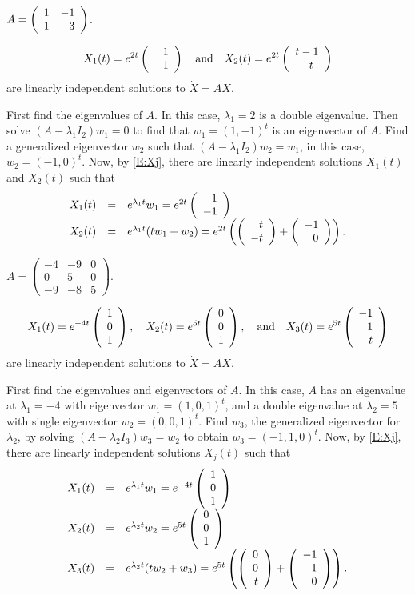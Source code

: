 \documentclass{ximera}
\begin{document}
\begin{exercise} \label{c12.1.2c}
$A=\left(\begin{array}{rr} 1 & -1\\ 1 &3\end{array}\right)$.

\begin{solution}
\ans
\[
X_1(t) = e^{2t}\left(\begin{array}{r} 1 \\ -1\end{array}\right) \quad\mbox{and}\quad
X_2(t) = e^{2t}\left(\begin{array}{c} t - 1 \\ -t\end{array}\right)
\]
are linearly independent solutions to $\dot{X} = AX$.

\soln First find the eigenvalues of $A$.  In this case, $\lambda_1 = 2$
is a double eigenvalue.  Then solve $(A - \lambda_1 I_2)w_1 = 0$ to
find that $w_1 = (1,-1)^t$ is an eigenvector of $A$.  Find a
generalized eigenvector $w_2$ such that $(A - \lambda_1 I_2)w_2 =
w_1$, in this case, $w_2 = (-1,0)^t$.  Now, by \eqref{E:Xj},
there are linearly independent solutions $X_1(t)$ and $X_2(t)$ such that
\[
\begin{array}{rcl}
X_1(t) & = & e^{\lambda_1 t}w_1 = e^{2t}\left(\begin{array}{r} 1 \\ -1\end{array}\right) \\
X_2(t) & = & e^{\lambda_1 t}(tw_1 + w_2) = e^{2t}\left(\left(\begin{array}{r} t \\ -t\end{array}\right) +
\left(\begin{array}{r} -1 \\ 0\end{array}\right)\right).
\end{array}
\]

\end{solution}
\end{exercise}
\begin{exercise} \label{c12.1.2d}
$A=\left(\begin{array}{rrr} -4 & -9 & 0\\ 0 & 5 & 0 \\ -9 & -8 & 5
\end{array}\right)$.

\begin{solution}
\ans
\[
X_1(t) = e^{-4t}\left(\begin{array}{r} 1 \\ 0 \\ 1\end{array}\right), \quad
X_2(t) = e^{5t}\left(\begin{array}{r} 0 \\ 0 \\ 1\end{array}\right), \quad\mbox{and}\quad
X_3(t) = e^{5t}\left(\begin{array}{r} -1 \\ 1 \\ t\end{array}\right)
\]
are linearly independent solutions to $\dot{X} = AX$.

\soln First find the eigenvalues and eigenvectors of $A$.  In this case,
$A$ has an eigenvalue at $\lambda_1 = -4$ with eigenvector $w_1 =
(1,0,1)^t$, and a double eigenvalue at $\lambda_2 = 5$ with single
eigenvector $w_2 = (0,0,1)^t$.  Find $w_3$, the generalized
eigenvector for $\lambda_2$, by solving $(A - \lambda_2 I_3)w_3 = w_2$
to obtain $w_3 = (-1,1,0)^t$.  Now, by \eqref{E:Xj},
there are linearly independent solutions $X_j(t)$ such that
\[
\begin{array}{rcl}
X_1(t) & = & e^{\lambda_1 t}w_1 = e^{-4t}\left(\begin{array}{r} 1 \\ 0 \\ 1\end{array}\right) \\
X_2(t) & = & e^{\lambda_2 t}w_2 = e^{5t}\left(\begin{array}{r} 0 \\ 0 \\ 1\end{array}\right) \\
X_3(t) & = & e^{\lambda_2 t}(tw_2 + w_3) = e^{5t}\left(\left(\begin{array}{r} 0 \\ 0 \\ t\end{array}\right)
+ \left(\begin{array}{r} -1 \\ 1 \\ 0\end{array}\right)\right).
\end{array}
\]

\end{solution}
\end{exercise}
\end{document}
